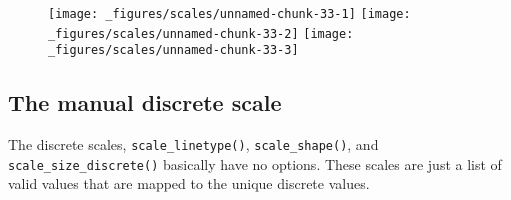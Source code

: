 \begin{Shaded}
\begin{Highlighting}[]
\StringTok{ }\NormalTok{(} \OperatorTok{:}\NormalTok{, } \OperatorTok{:}\NormalTok{, } \NormalTok{(}\NormalTok{, }\NormalTok{, }\NormalTok{))}
\StringTok{ }\OperatorTok{+}\StringTok{ }
\StringTok{  }\NormalTok{(}\NormalTok{(} \NormalTok{) }\OperatorTok{+}\StringTok{ }
\StringTok{  }\NormalTok{(} \NormalTok{) }\OperatorTok{+}
\StringTok{  }\NormalTok{(} \NormalTok{, } \NormalTok{)}
\OperatorTok{+}\StringTok{ }\NormalTok{(} \NormalTok{)}
\OperatorTok{+}\StringTok{ }\NormalTok{(} \NormalTok{)}
\OperatorTok{+}\StringTok{ }\NormalTok{(} \NormalTok{)}
\end{Highlighting}
\end{Shaded}

\begin{figure}[H]
  \texttt{[image: \_figures/scales/unnamed-chunk-33-1]}%
  \texttt{[image: \_figures/scales/unnamed-chunk-33-2]}%
  \texttt{[image: \_figures/scales/unnamed-chunk-33-3]}
\end{figure}

\hypertarget{sub:scale-manual}{%
\subsection{The manual discrete scale}\label{sub:scale-manual}}

The discrete scales, \texttt{scale\_linetype()},
\texttt{scale\_shape()}, and \texttt{scale\_size\_discrete()} basically
have no options. These scales are just a list of valid values that are
mapped to the unique discrete values.  
 
 

